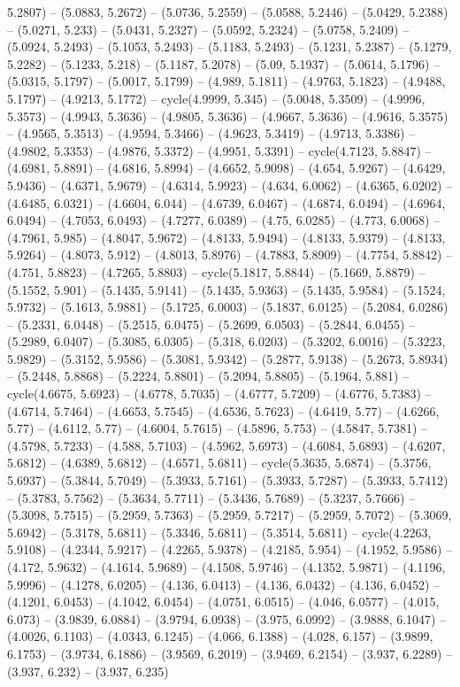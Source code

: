 5.2807) -- (5.0883, 5.2672) -- (5.0736, 5.2559) -- (5.0588, 5.2446) -- (5.0429, 5.2388) -- (5.0271, 5.233) -- (5.0431, 5.2327) -- (5.0592, 5.2324) -- (5.0758, 5.2409) -- (5.0924, 5.2493) -- (5.1053, 5.2493) -- (5.1183, 5.2493) -- (5.1231, 5.2387) -- (5.1279, 5.2282) -- (5.1233, 5.218) -- (5.1187, 5.2078) -- (5.09, 5.1937) -- (5.0614, 5.1796) -- (5.0315, 5.1797) -- (5.0017, 5.1799) -- (4.989, 5.1811) -- (4.9763, 5.1823) -- (4.9488, 5.1797) -- (4.9213, 5.1772) -- cycle(4.9999, 5.345) -- (5.0048, 5.3509) -- (4.9996, 5.3573) -- (4.9943, 5.3636) -- (4.9805, 5.3636) -- (4.9667, 5.3636) -- (4.9616, 5.3575) -- (4.9565, 5.3513) -- (4.9594, 5.3466) -- (4.9623, 5.3419) -- (4.9713, 5.3386) -- (4.9802, 5.3353) -- (4.9876, 5.3372) -- (4.9951, 5.3391) -- cycle(4.7123, 5.8847) -- (4.6981, 5.8891) -- (4.6816, 5.8994) -- (4.6652, 5.9098) -- (4.654, 5.9267) -- (4.6429, 5.9436) -- (4.6371, 5.9679) -- (4.6314, 5.9923) -- (4.634, 6.0062) -- (4.6365, 6.0202) -- (4.6485, 6.0321) -- (4.6604, 6.044) -- (4.6739, 6.0467) -- (4.6874, 6.0494) -- (4.6964, 6.0494) -- (4.7053, 6.0493) -- (4.7277, 6.0389) -- (4.75, 6.0285) -- (4.773, 6.0068) -- (4.7961, 5.985) -- (4.8047, 5.9672) -- (4.8133, 5.9494) -- (4.8133, 5.9379) -- (4.8133, 5.9264) -- (4.8073, 5.912) -- (4.8013, 5.8976) -- (4.7883, 5.8909) -- (4.7754, 5.8842) -- (4.751, 5.8823) -- (4.7265, 5.8803) -- cycle(5.1817, 5.8844) -- (5.1669, 5.8879) -- (5.1552, 5.901) -- (5.1435, 5.9141) -- (5.1435, 5.9363) -- (5.1435, 5.9584) -- (5.1524, 5.9732) -- (5.1613, 5.9881) -- (5.1725, 6.0003) -- (5.1837, 6.0125) -- (5.2084, 6.0286) -- (5.2331, 6.0448) -- (5.2515, 6.0475) -- (5.2699, 6.0503) -- (5.2844, 6.0455) -- (5.2989, 6.0407) -- (5.3085, 6.0305) -- (5.318, 6.0203) -- (5.3202, 6.0016) -- (5.3223, 5.9829) -- (5.3152, 5.9586) -- (5.3081, 5.9342) -- (5.2877, 5.9138) -- (5.2673, 5.8934) -- (5.2448, 5.8868) -- (5.2224, 5.8801) -- (5.2094, 5.8805) -- (5.1964, 5.881) -- cycle(4.6675, 5.6923) -- (4.6778, 5.7035) -- (4.6777, 5.7209) -- (4.6776, 5.7383) -- (4.6714, 5.7464) -- (4.6653, 5.7545) -- (4.6536, 5.7623) -- (4.6419, 5.77) -- (4.6266, 5.77) -- (4.6112, 5.77) -- (4.6004, 5.7615) -- (4.5896, 5.753) -- (4.5847, 5.7381) -- (4.5798, 5.7233) -- (4.588, 5.7103) -- (4.5962, 5.6973) -- (4.6084, 5.6893) -- (4.6207, 5.6812) -- (4.6389, 5.6812) -- (4.6571, 5.6811) -- cycle(5.3635, 5.6874) -- (5.3756, 5.6937) -- (5.3844, 5.7049) -- (5.3933, 5.7161) -- (5.3933, 5.7287) -- (5.3933, 5.7412) -- (5.3783, 5.7562) -- (5.3634, 5.7711) -- (5.3436, 5.7689) -- (5.3237, 5.7666) -- (5.3098, 5.7515) -- (5.2959, 5.7363) -- (5.2959, 5.7217) -- (5.2959, 5.7072) -- (5.3069, 5.6942) -- (5.3178, 5.6811) -- (5.3346, 5.6811) -- (5.3514, 5.6811) -- cycle(4.2263, 5.9108) -- (4.2344, 5.9217) -- (4.2265, 5.9378) -- (4.2185, 5.954) -- (4.1952, 5.9586) -- (4.172, 5.9632) -- (4.1614, 5.9689) -- (4.1508, 5.9746) -- (4.1352, 5.9871) -- (4.1196, 5.9996) -- (4.1278, 6.0205) -- (4.136, 6.0413) -- (4.136, 6.0432) -- (4.136, 6.0452) -- (4.1201, 6.0453) -- (4.1042, 6.0454) -- (4.0751, 6.0515) -- (4.046, 6.0577) -- (4.015, 6.073) -- (3.9839, 6.0884) -- (3.9794, 6.0938) -- (3.975, 6.0992) -- (3.9888, 6.1047) -- (4.0026, 6.1103) -- (4.0343, 6.1245) -- (4.066, 6.1388) -- (4.028, 6.157) -- (3.9899, 6.1753) -- (3.9734, 6.1886) -- (3.9569, 6.2019) -- (3.9469, 6.2154) -- (3.937, 6.2289) -- (3.937, 6.232) -- (3.937, 6.235) 